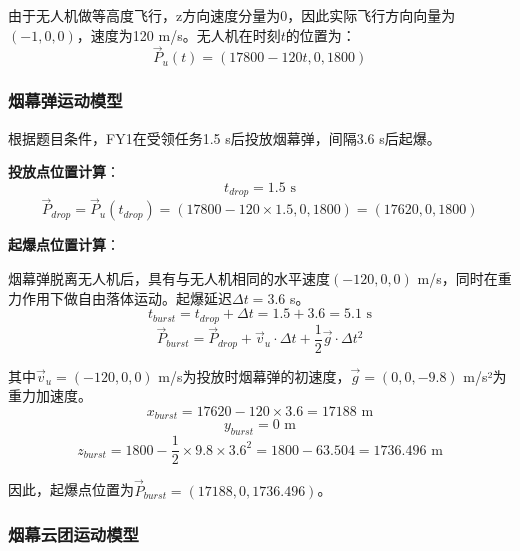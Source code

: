 \documentclass[12pt,a4paper]{article}
\begin{document}
\indent 由于无人机做等高度飞行，z方向速度分量为0，因此实际飞行方向向量为$(-1, 0, 0)$，速度为120 m/s。无人机在时刻$t$的位置为：
\begin{equation}
\vec{P}_u(t) = (17800 - 120t, 0, 1800)
\end{equation}

\subsubsection{烟幕弹运动模型}

\indent 根据题目条件，FY1在受领任务1.5 s后投放烟幕弹，间隔3.6 s后起爆。

\noindent\textbf{投放点位置计算}：
\begin{equation}
t_{drop} = 1.5 \text{ s}
\end{equation}
\begin{equation}
\vec{P}_{drop} = \vec{P}_u(t_{drop}) = (17800 - 120 \times 1.5, 0, 1800) = (17620, 0, 1800)
\end{equation}

\noindent\textbf{起爆点位置计算}：

\indent 烟幕弹脱离无人机后，具有与无人机相同的水平速度$(-120, 0, 0)$ m/s，同时在重力作用下做自由落体运动。起爆延迟$\Delta t = 3.6$ s。
\begin{equation}
t_{burst} = t_{drop} + \Delta t = 1.5 + 3.6 = 5.1 \text{ s}
\end{equation}
\begin{equation}
\vec{P}_{burst} = \vec{P}_{drop} + \vec{v}_u \cdot \Delta t + \frac{1}{2}\vec{g} \cdot \Delta t^2
\end{equation}

\indent 其中$\vec{v}_u = (-120, 0, 0)$ m/s为投放时烟幕弹的初速度，$\vec{g} = (0, 0, -9.8)$ m/s²为重力加速度。
\begin{equation}
x_{burst} = 17620 - 120 \times 3.6 = 17188 \text{ m}
\end{equation}
\begin{equation}
y_{burst} = 0 \text{ m}
\end{equation}
\begin{equation}
z_{burst} = 1800 - \frac{1}{2} \times 9.8 \times 3.6^2 = 1800 - 63.504 = 1736.496 \text{ m}
\end{equation}

\indent 因此，起爆点位置为$\vec{P}_{burst} = (17188, 0, 1736.496)$。

\subsubsection{烟幕云团运动模型}
\end{document}
